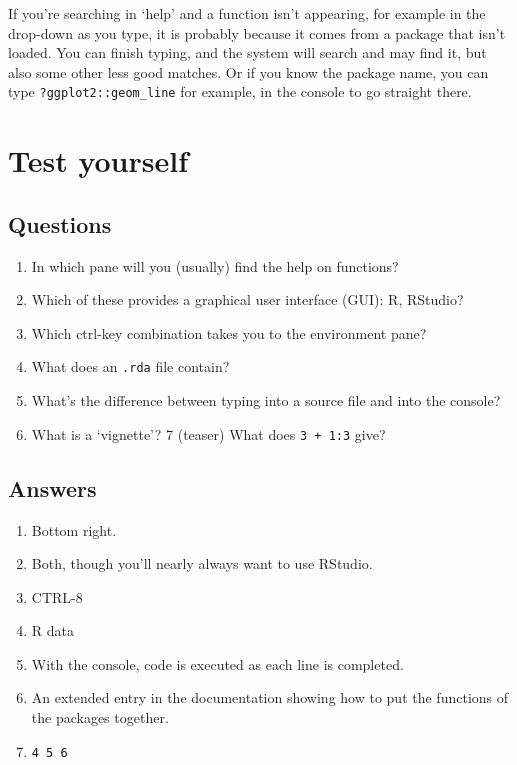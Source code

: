 \documentclass[
]{book}
\providecommand{\tightlist}{%
  \setlength{\itemsep}{0pt}\setlength{\parskip}{0pt}}
\begin{document}
If you're searching in `help' and a function isn't appearing, for example in the drop-down as you type, it is probably because it comes from a package that isn't loaded. You can finish typing, and the system will search and may find it, but also some other less good matches. Or if you know the package name, you can type \texttt{?ggplot2::geom\_line} for example, in the console to go straight there.

\hypertarget{test-yourself}{%
\section{Test yourself}\label{test-yourself}}

\hypertarget{questions}{%
\subsection{Questions}\label{questions}}

\begin{enumerate}
\def\labelenumi{\arabic{enumi}.}
\tightlist
\item
  In which pane will you (usually) find the help on functions?
\item
  Which of these provides a graphical user interface (GUI): R, RStudio?
\item
  Which ctrl-key combination takes you to the environment pane?
\item
  What does an \texttt{.rda} file contain?
\item
  What's the difference between typing into a source file and into the console?
\item
  What is a `vignette'?
  7 (teaser) What does \texttt{3\ +\ 1:3} give?
\end{enumerate}

\hypertarget{answers}{%
\subsection{Answers}\label{answers}}

\begin{enumerate}
\def\labelenumi{\arabic{enumi}.}
\tightlist
\item
  Bottom right.
\item
  Both, though you'll nearly always want to use RStudio.
\item
  CTRL-8
\item
  R data
\item
  With the console, code is executed as each line is completed.
\item
  An extended entry in the documentation showing how to put the functions of the packages together.
\item
  \texttt{4\ 5\ 6}
\end{enumerate}
\end{document}
